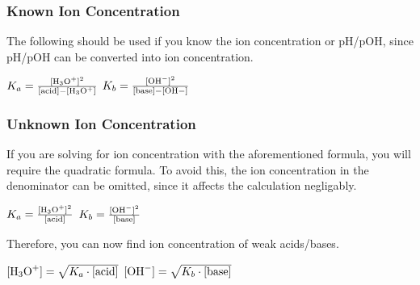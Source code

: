 \documentclass[a4paper,12pt]{article}
\begin{document}
\subsubsection{Known Ion Concentration}
The following should be used if you know the ion concentration or pH/pOH, since pH/pOH can be converted into ion concentration.

\begin{center}
\Large
$K_a = \frac{[\ce{H3O+}]^2}{[\textrm{acid}] - [\ce{H3O+]}}$
\hspace{0.5in}
$K_b = \frac{[\ce{OH-}]^2}{[\textrm{base}] - [\ce{OH-]}}$
\normalsize
\end{center}

\subsubsection{Unknown Ion Concentration}
If you are solving for ion concentration with the aforementioned formula, you will require the quadratic formula. To avoid this, the ion concentration in the denominator can be omitted, since it affects the calculation negligably.

\begin{center}
\Large
$K_a = \frac{[\ce{H3O+}]^2}{[\textrm{acid}]}$
\hspace{0.5in}
$K_b = \frac{[\ce{OH-}]^2}{[\textrm{base}]}$
\normalsize
\end{center}

Therefore, you can now find ion concentration of weak acids/bases.

\begin{center}
\Large
$[\ce{H3O+}] = \sqrt{K_a \cdot [\textrm{acid}]}$
\hspace{0.5in}
$[\ce{OH-}] = \sqrt{K_b \cdot [\textrm{base}]}$
\normalsize
\end{center}
\end{document}
